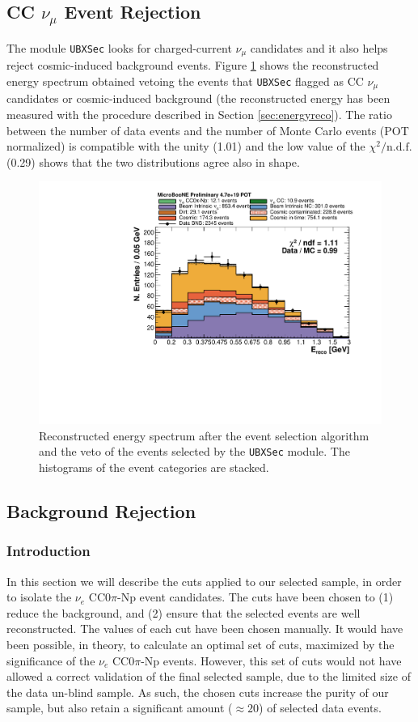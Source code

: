 \subsection{CC \texorpdfstring{$\nu_{\mu}$}{numu} Event Rejection}\label{sec:numu}
The module \texttt{UBXSec} \cite{ubxsec} looks for charged-current $\nu_{\mu}$ candidates and it also helps reject cosmic-induced background events.  Figure \ref{fig:spectrum} shows the reconstructed energy spectrum obtained vetoing the events that \texttt{UBXSec} flagged as CC $\nu_{\mu}$ candidates or cosmic-induced background (the reconstructed energy has been measured with the procedure described in Section \ref{sec:energyreco}). The ratio between the number of data events and the number of Monte Carlo events (POT normalized) is compatible with the unity (1.01) and the low value of the $\chi^{2} / \mathrm{n.d.f.}$ (0.29) shows that the two distributions agree also in shape.

\begin{figure}[htbp]
\centering
  \includegraphics[width=0.65\linewidth]{figures/h_fixed_energy.pdf}
  \caption{Reconstructed energy spectrum after the event selection algorithm and the veto of the events selected by the \texttt{UBXSec} module. The histograms of the event categories are stacked.}
  \label{fig:spectrum}
\end{figure}

\subsection{Background Rejection}\label{sec:bkg}
\subsubsection{Introduction}
In this section we will describe the cuts applied to our selected sample, in order to isolate the $\nu_{e}$ CC$0\pi$-Np event candidates. The cuts have been chosen to (1) reduce the background, and (2) ensure that the selected events are well reconstructed. The values of each cut have been chosen manually. It would have been possible, in theory, to calculate an optimal set of cuts, maximized by the significance of the $\nu_{e}$ CC0$\pi$-Np events. However, this set of cuts would not have allowed a correct validation of the final selected sample, due to the limited size of the data un-blind sample. As such, the chosen cuts increase the purity of our sample, but also retain a significant amount ($\approx 20$) of selected data events.

